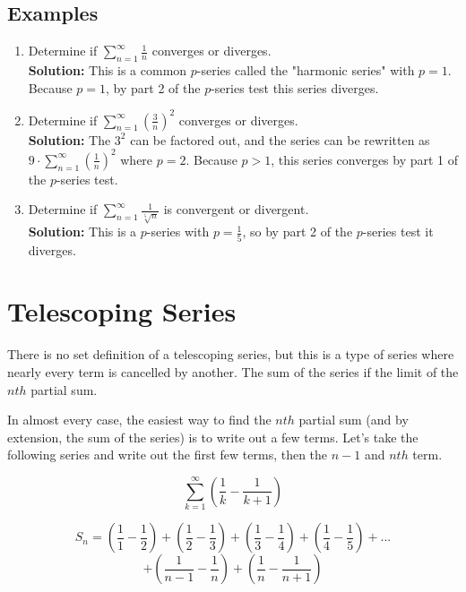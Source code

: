 \documentclass[12pt]{report}
\begin{document}
\subsection*{Examples}
\begin{enumerate}
	\item Determine if $\sum_{n=1}^{\infty} \frac{1}{n}$ converges or diverges. \\
	
	\textbf{Solution:} This is a common $p$-series called the "harmonic series" with $p = 1$. Because $p = 1$, by part 2 of the $p$-series test this series diverges.
	
	\item Determine if $\sum_{n=1}^{\infty} \left( \frac{3}{n} \right)^2$ converges or diverges. \\
	
	\textbf{Solution:} The $3^2$ can be factored out, and the series can be rewritten as $9 \cdot \sum_{n=1}^{\infty} \left( \frac{1}{n} \right)^2$ where $p = 2$. Because $p > 1$, this series converges by part 1 of the $p$-series test.
	
	\item Determine if $\sum_{n=1}^{\infty} \frac{1}{\sqrt[5]{n}}$ is convergent or divergent. \\
	
	\textbf{Solution:} This is a $p$-series with $p = \frac{1}{5}$, so by part 2 of the $p$-series test it diverges.
\end{enumerate}


\clearpage


\section{Telescoping Series}
There is no set definition of a telescoping series, but this is a type of series where nearly every term is cancelled by another. The sum of the series if the limit of the $nth$ partial sum. 

In almost every case, the easiest way to find the $nth$ partial sum (and by extension, the sum of the series) is to write out a few terms. Let's take the following series and write out the first few terms, then the $n-1$ and $nth$ term. 

    $$ \sum_{k=1}^{\infty} \left( \frac{1}{k} - \frac{1}{k+1} \right) $$

    $$
        S_n = \left( \frac{1}{1} - \frac{1}{2} \right) + \left( \frac{1}{2} - \frac{1}{3} \right) +  \left( \frac{1}{3} - \frac{1}{4} \right) +  \left( \frac{1}{4} - \frac{1}{5} \right) + ...
    $$
    $$
        +  \left( \frac{1}{n-1} - \frac{1}{n} \right) +  \left( \frac{1}{n} - \frac{1}{n+1} \right)
    $$
\end{document}
